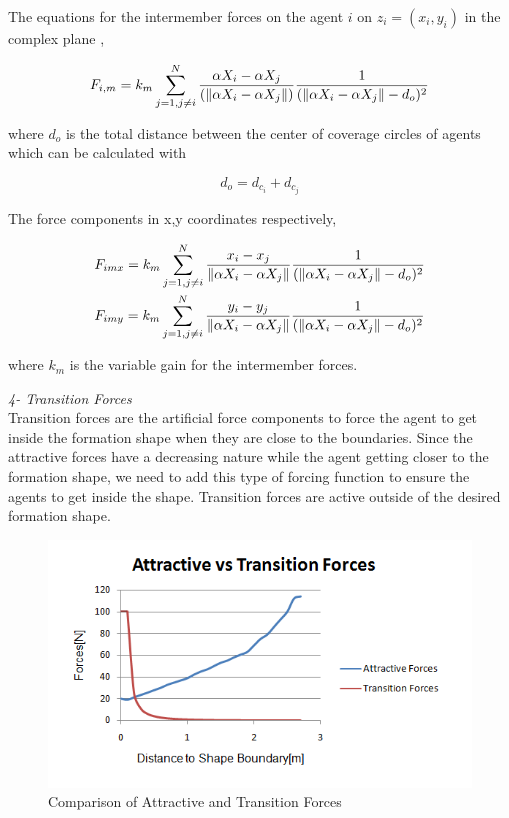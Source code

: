 The equations for the intermember forces on the agent $i$ on $z_i = (x_i, y_i)$  in the complex plane \cite{17},
			
\begin{equation}
F_{i,m} = k_m \sum_{j=1, j\neq i}^{N}\frac{\alpha X_i - \alpha X_j}{(\left\lVert\alpha X_i - \alpha X_j\right\rVert)} \frac{1}{(\left\lVert\alpha X_i - \alpha X_j\right\rVert - d_o)^2}
\end{equation}
			
where $d_o$ is the total distance between the center of coverage circles of agents which can be calculated with

\begin{equation}
 d_o = d_{c_i} + d_{c_j}
\end{equation}			

The force components in x,y coordinates respectively,

\begin{align}
\begin{split}
&F_{imx} = k_m \sum_{j=1, j\neq i}^{N}\frac{x_i- x_j}{\left\lVert\alpha X_i - \alpha X_j\right\rVert}  \frac{1}{(\left\lVert\alpha X_i - \alpha X_j\right\rVert - d_o)^2}\\
&F_{imy} = k_m \sum_{j=1, j\neq i}^{N}\frac{y_i- y_j}{\left\lVert\alpha X_i - \alpha X_j\right\rVert}  \frac{1}{(\left\lVert\alpha X_i - \alpha X_j\right\rVert - d_o)^2}\\
\end{split}
\end{align}
		
where $k_m$ is the variable gain for the intermember forces.  \newline
			
\textit{4- Transition Forces} \\ 		
Transition forces are the artificial force components to force the agent to get inside the formation shape when they are close to the boundaries. Since the attractive forces have a decreasing nature while the agent getting closer to the formation shape, we need to add this type of forcing function to ensure the agents to get inside the shape. Transition forces are active outside of the desired formation shape.
			
\begin{figure}[H]
\caption{Comparison of Attractive and Transition Forces}
\centering
\includegraphics[scale = 0.80]{transition_forces}
\end{figure}		

